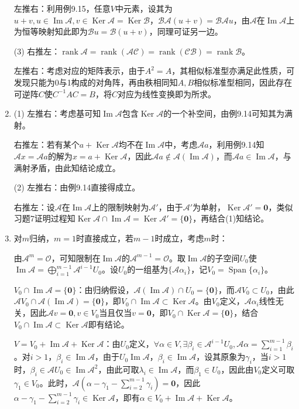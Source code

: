 \documentclass[a4paper,UTF8,fontset=windows]{ctexart}
\DeclareMathOperator{\im}{Im}
\DeclareMathOperator{\Ker}{Ker}
\DeclareMathOperator{\rank}{rank}
\DeclareMathOperator{\Span}{Span}
\begin{document}
\begin{enumerate}
左推右：利用例9.15，任意$V$中元素，设其为$u+v,u\in\im\mathcal{A},v\in\Ker\mathcal{A}=\Ker\mathcal{B}$，$\mathcal{B}\mathcal{A}(u+v)=\mathcal{B}\mathcal{A}u$，由$\mathcal{A}$在$\im\mathcal{A}$上为恒等映射知此即为$\mathcal{B}u=\mathcal{B}(u+v)$，同理可证另一边。

(3) 右推左：$\rank\mathcal{A}=\rank(\mathcal{A}\mathcal{C})=\rank(\mathcal{C}\mathcal{B})=\rank\mathcal{B}$。

左推右：考虑对应的矩阵表示，由于$A^2=A$，其相似标准型亦满足此性质，可发现只能为0与1构成的对角阵，再由秩相同知$A,B$相似标准型相同，因此存在可逆阵$C$使$C^{-1}AC=B$，将$C$对应为线性变换即为所求。

\item
(1) 左推右：考虑基可知$\im\mathcal{A}$包含$\Ker\mathcal{A}$的一个补空间，由例9.14可知其为满射。

右推左：若有某个$a+\Ker\mathcal{A}$均不在$\im\mathcal{A}$中，考虑$\mathcal{A}a$，利用例9.14知$\mathcal{A}x=\mathcal{A}a$的解为$x=a+\Ker\mathcal{A}$，因此$\mathcal{A}a\notin\mathcal{A}(\im\mathcal{A})$，而$\mathcal{A}a\in\im\mathcal{A}$，与满射矛盾，由此知结论成立。

(2) 左推右：由例9.14直接得成立。

右推左：设$\mathcal{A}$在$\im\mathcal{A}$上的限制映射为$\mathcal{A}'$，由于$\mathcal{A}'$为单射，$\Ker\mathcal{A}'=\mathbf{0}$，类似习题7证明过程知$\Ker\mathcal{A}\cap\im\mathcal{A}=\Ker\mathcal{A}'=\{\mathbf{0}\}$，再结合(1)知结论。

\item
对$m$归纳，$m=1$时直接成立，若$m-1$时成立，考虑$m$时：

由$\mathcal{A}^{m}=\mathcal{O}$，可知限制在$\im\mathcal{A}$的$\mathcal{A}^{m-1}=\mathcal{O}$。取$\im\mathcal{A}$的子空间$U_0$使$\im\mathcal{A}=\bigoplus_{i=1}^{m-1}\mathcal{A}^{i-1}U_0$。设$U_0$的一组基为$\{\mathcal{A}\alpha_i\}$，记$V_0=\Span\{\alpha_i\}$。

$V_0\cap\im\mathcal{A}=\{\mathbf{0}\}$：由归纳假设，$\mathcal{A}(\im\mathcal{A})\cap U_0=\{\mathbf{0}\}$，而$\mathcal{A}V_0\subset U_0$，由此$\mathcal{A}V_0\cap\mathcal{A}(\im\mathcal{A})=\{\mathbf{0}\}$，即$V_0\cap\im\mathcal{A}\subset\Ker\mathcal{A}$。由$V_0$定义，$\mathcal{A}\alpha_i$线性无关，因此$\mathcal{A}v=\mathbf{0},v\in V_0$当且仅当$v=\mathbf{0}$，即$V_0\cap\Ker\mathcal{A}=\{\mathbf{0}\}$，结合$V_0\cap\im\mathcal{A}\subset\Ker\mathcal{A}$即有结论。

$V=V_0+\im\mathcal{A}+\Ker\mathcal{A}$：由$U_0$定义，$\forall\alpha\in V,\exists\beta_i\in\mathcal{A}^{i-1}U_0,\mathcal{A}\alpha=\sum_{i=1}^{m-1}\beta_i$。对$i>1$，$\beta_i\in\im\mathcal{A}$，由于$U_0\im\mathcal{A}$，$\beta_i\in\im\mathcal{A}$，设其原象为$\gamma_i$，当$i>1$时，$\beta_i\in\mathcal{A}U_0\in\im\mathcal{A}^2$，由此可取$\lambda_i\in\im\mathcal{A}$，而$\beta_1\in U_0$，因此由$V_0$定义可取$\gamma_1\in V_0$。此时，$\mathcal{A}(\alpha-\gamma_1-\sum_{i=2}^{m-1}\gamma_i)=\mathbf{0}$，因此$\alpha-\gamma_1-\sum_{i=2}^{m-1}\gamma_i\in\Ker\mathcal{A}$，即有$\alpha\in V_0+\im\mathcal{A}+\Ker\mathcal{A}$。


\end{enumerate}
\end{document}
